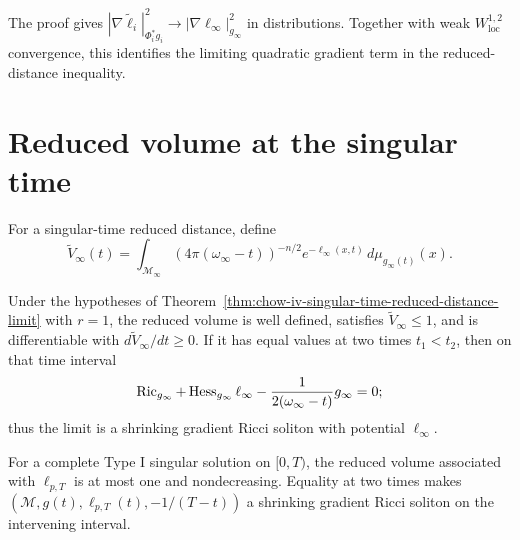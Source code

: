 \begin{remark}
\label{rem:chow-iv-strong-reduced-distance-gradient-convergence}


The proof gives
\(|\nabla\widetilde\ell_i|^2_{\Phi_i^*g_i}
\to|\nabla\ell_\infty|^2_{g_\infty}\) in distributions.  Together with
weak \(W^{1,2}_{\mathrm{loc}}\) convergence, this identifies the limiting
quadratic gradient term in the reduced-distance inequality.
\end{remark}

\section{Reduced volume at the singular time}

For a singular-time reduced distance, define
\[
 \widetilde V_\infty(t)=
 \int_{\mathcal M_\infty}(4\pi(\omega_\infty-t))^{-n/2}
 e^{-\ell_\infty(x,t)}\,d\mu_{g_\infty(t)}(x).
\]

\begin{theorem}
\label{thm:chow-iv-singular-time-reduced-volume-monotonicity}


Under the hypotheses of
Theorem~\ref{thm:chow-iv-singular-time-reduced-distance-limit} with \(r=1\),
the reduced volume is well defined, satisfies \(\widetilde V_\infty\leq1\),
and is differentiable with \(d\widetilde V_\infty/dt\geq0\).  If it has
equal values at two times \(t_1<t_2\), then on that time interval
\[
 \operatorname{Ric}_{g_\infty}+\operatorname{Hess}_{g_\infty}\ell_\infty
 -\frac{1}{2(\omega_\infty-t)}g_\infty=0;
\]
thus the limit is a shrinking gradient Ricci soliton with potential
\(\ell_\infty\).
\end{theorem}

\begin{corollary}
\label{cor:chow-iv-type-i-singular-time-reduced-volume}


For a complete Type I singular solution on \([0,T)\), the reduced volume
associated with \(\ell_{p,T}\) is at most one and nondecreasing.  Equality at
two times makes
\((\mathcal M,g(t),\ell_{p,T}(t),-1/(T-t))\) a shrinking gradient Ricci
soliton on the intervening interval.
\end{corollary}


